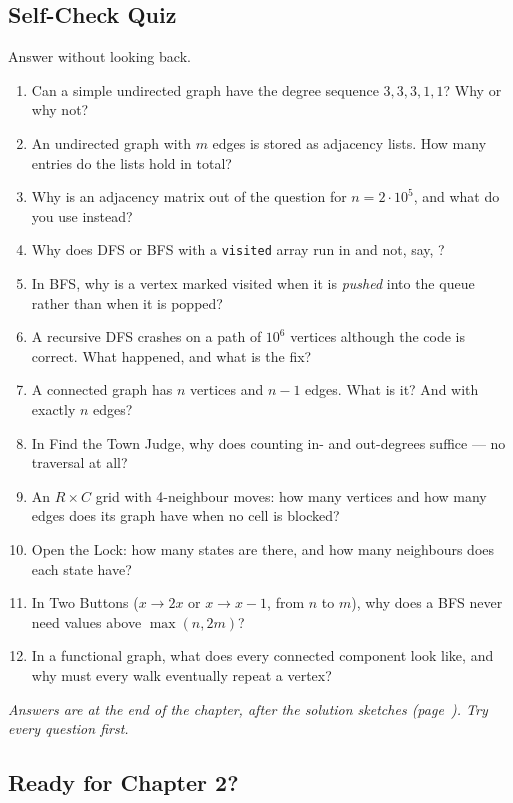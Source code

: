 \subsection{Self-Check Quiz}

Answer without looking back.
\begin{enumerate}[leftmargin=*]
    \item Can a simple undirected graph have the degree sequence $3, 3, 3, 1, 1$? Why or why not?
    \item An undirected graph with $m$ edges is stored as adjacency lists. How many entries do the lists hold in total?
    \item Why is an adjacency matrix out of the question for $n = 2 \cdot 10^5$, and what do you use instead?
    \item Why does DFS or BFS with a \texttt{visited} array run in  and not, say, ?
    \item In BFS, why is a vertex marked visited when it is \emph{pushed} into the queue rather than when it is popped?
    \item A recursive DFS crashes on a path of $10^6$ vertices although the code is correct. What happened, and what is the fix?
    \item A connected graph has $n$ vertices and $n-1$ edges. What is it? And with exactly $n$ edges?
    \item In Find the Town Judge, why does counting in- and out-degrees suffice --- no traversal at all?
    \item An $R \times C$ grid with 4-neighbour moves: how many vertices and how many edges does its graph have when no cell is blocked?
    \item Open the Lock: how many states are there, and how many neighbours does each state have?
    \item In Two Buttons ($x \to 2x$ or $x \to x-1$, from $n$ to $m$), why does a BFS never need values above $\max(n, 2m)$?
    \item In a functional graph, what does every connected component look like, and why must every walk eventually repeat a vertex?
\end{enumerate}

\noindent\textit{Answers are at the end of the chapter, after the solution sketches (page~\pageref{ssec:ch1-quiz-answers}). Try every question first.}

\subsection{Ready for Chapter 2?}

